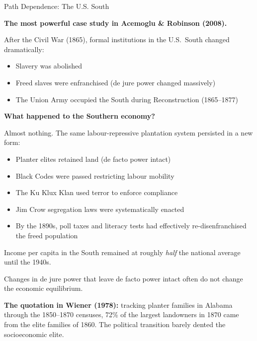 \documentclass[10pt]{beamer}
\begin{document}
\begin{frame}[allowframebreaks]{Path Dependence: The U.S. South}

\textbf{The most powerful case study in Acemoglu \& Robinson (2008).}


After the Civil War (1865), formal institutions in the U.S.\ South changed dramatically:
\begin{itemize}
\item Slavery was abolished
\item Freed slaves were enfranchised (de jure power changed massively)
\item The Union Army occupied the South during Reconstruction (1865--1877)
\end{itemize}


\textbf{What happened to the Southern economy?}

Almost nothing. The same labour-repressive plantation system persisted in a new form:
\begin{itemize}
\item Planter elites retained land (de facto power intact)
\item Black Codes were passed restricting labour mobility
\item The Ku Klux Klan used terror to enforce compliance
\item Jim Crow segregation laws were systematically enacted
\item By the 1890s, poll taxes and literacy tests had effectively re-disenfranchised the freed population
\end{itemize}


Income per capita in the South remained at roughly \emph{half} the national average until the 1940s.


\alert{Changes in de jure power that leave de facto power intact often do not change the economic equilibrium.}


\textbf{The quotation in Wiener (1978):} tracking planter families in Alabama through the 1850--1870 censuses, 72\% of the largest landowners in 1870 came from the elite families of 1860. The political transition barely dented the socioeconomic elite.
\end{frame}
\end{document}
